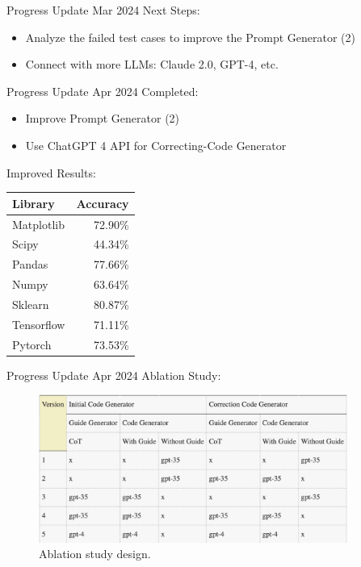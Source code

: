 \begin{frame}{Progress Update  Mar 2024}
    Next Steps:
    \begin{itemize}
        \item Analyze the failed test cases to improve the Prompt Generator (2)
        \item Connect with more LLMs: Claude 2.0, GPT-4, etc.
    \end{itemize}
\end{frame}

\begin{frame}{Progress Update  Apr 2024}
    Completed:
    \begin{itemize}
        \item Improve Prompt Generator (2)
        \item Use ChatGPT 4 API for Correcting-Code Generator
    \end{itemize}

    Improved Results:
    \begin{tabular}{lr}
        Library    & Accuracy \\
        \hline
        Matplotlib & 72.90\%  \\
        Scipy      & 44.34\%  \\
        Pandas     & 77.66\%  \\
        Numpy      & 63.64\%  \\
        Sklearn    & 80.87\%  \\
        Tensorflow & 71.11\%  \\
        Pytorch    & 73.53\%  \\
    \end{tabular}
\end{frame}

\begin{frame}{Progress Update  Apr 2024}
    Ablation Study:

    \begin{figure}[!htb]
        \centering
        \includegraphics[width=0.9\textwidth]{img/ablation_study}
        \captionsetup{font=small,labelformat=empty}
        \caption{Ablation study design.}
    \end{figure}
\end{frame}
